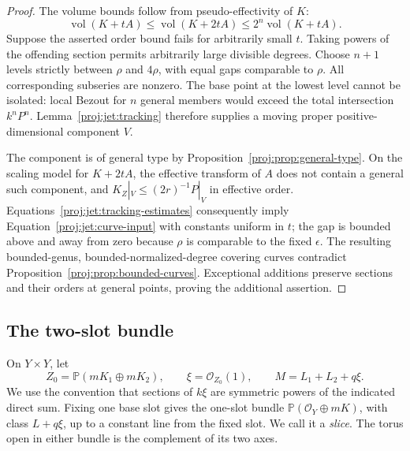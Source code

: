 \documentclass[11pt,letterpaper]{article}
\newcommand{\PP}{\mathbb{P}}
\newcommand{\OO}{\mathcal{O}}
\DeclareMathOperator{\vol}{vol}
\theoremstyle{definition}
\theoremstyle{remark}
\begin{document}
\begin{proof}
The volume bounds follow from pseudo-effectivity of \(K\):
\[
 \vol(K+tA)\le\vol(K+2tA)\le2^n\vol(K+tA).
\]
Suppose the asserted order bound fails for arbitrarily small \(t\).
Taking powers of the offending section permits arbitrarily large
divisible degrees.  Choose \(n+1\) levels strictly between \(\rho\)
and \(4\rho\), with equal gaps comparable to \(\rho\).
All corresponding subseries are nonzero.  The base point at the
lowest level cannot be isolated: local Bezout for \(n\) general
members would exceed the total intersection \(k^nP^n\).
Lemma~\ref{proj:jet:tracking} therefore supplies a moving proper
positive-dimensional component \(V\).

The component is of general type by
Proposition~\ref{proj:prop:general-type}.  On the scaling model for
\(K+2tA\), the effective transform of \(A\) does not contain a
general such component, and
\(K_Z|_V\le(2r)^{-1}P|_V\) in effective order.
Equations~\eqref{proj:jet:tracking-estimates} consequently imply
Equation~\eqref{proj:jet:curve-input} with constants uniform in \(t\);
the gap is bounded above and away from zero because
\(\rho\) is comparable to the fixed \(\epsilon\).
The resulting bounded-genus, bounded-normalized-degree covering
curves contradict Proposition~\ref{proj:prop:bounded-curves}.
Exceptional additions preserve sections and their orders at
general points, proving the additional assertion.
\end{proof}

\subsection{The two-slot bundle}

On \(Y\times Y\), let
\begin{equation}\label{proj:jet:two-slot}
 Z_0=\PP(mK_1\oplus mK_2),\qquad
 \xi=\OO_{Z_0}(1),\qquad M=L_1+L_2+q\xi.
\end{equation}
We use the convention that sections of \(k\xi\) are symmetric powers
of the indicated direct sum.  Fixing one base slot gives the
one-slot bundle
\(\PP(\OO_Y\oplus mK)\), with class \(L+q\xi\), up to a constant
line from the fixed slot.  We call it a \emph{slice}.
The torus open in either bundle is the complement of its two axes.
\end{document}
